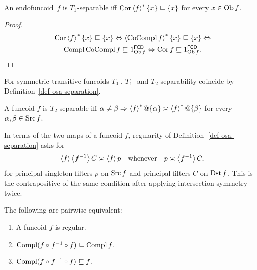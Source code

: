 \begin{prop}
An endofuncoid~$f$ is $T_{1}$-separable iff $\operatorname{Cor}\left\langle f\right\rangle ^{\ast}\{x\}\sqsubseteq\{x\}$ for every $x\in\operatorname{Ob} f$.
\end{prop}

\begin{proof}
\begin{multline*}
\operatorname{Cor} \left\langle f\right\rangle ^{\ast} \{ x \} \sqsubseteq \{ x \}
\Leftrightarrow \left\langle \operatorname{CoCompl} f\right\rangle ^{\ast} \{ x \} \sqsubseteq \{
x \} \Leftrightarrow \\ \operatorname{Compl} \operatorname{CoCompl} f \sqsubseteq
1^{\mathsf{FCD}}_{\operatorname{Ob} f} \Leftrightarrow \operatorname{Cor} f \sqsubseteq
1^{\mathsf{FCD}}_{\operatorname{Ob} f}.
\end{multline*}
\end{proof}

For symmetric transitive funcoids $T_{0}$-, $T_{1}$- and $T_{2}$-separability
coincide by Definition~\ref{def-osa-separation}.
\begin{obvious}
A funcoid $f$ is $T_{2}$-separable iff $\alpha\ne\beta\Rightarrow\left\langle f\right\rangle ^{\ast}@\{\alpha\}\asymp\left\langle f\right\rangle ^{\ast}@\{\beta\}$
for every $\alpha,\beta\in\operatorname{Src} f$.\end{obvious}
In terms of the two maps of a funcoid $f$, regularity of
Definition~\ref{def-osa-separation} asks for
\[
 \left\langle f\right\rangle\left\langle f^{-1}\right\rangle C\asymp\left\langle f\right\rangle p
 \quad\text{whenever}\quad
 p\asymp\left\langle f^{-1}\right\rangle C,
\]
for principal singleton filters $p$ on $\operatorname{Src} f$ and principal
filters $C$ on $\operatorname{Dst} f$. This is the contrapositive of the same
condition after applying intersection symmetry twice.

\begin{prop}
The following are pairwise equivalent:
\begin{enumerate}
  \item A funcoid $f$ is regular.
  \item $\operatorname{Compl} (f \circ f^{- 1} \circ f) \sqsubseteq \operatorname{Compl} f$.
  \item $\operatorname{Compl} (f \circ f^{- 1} \circ f) \sqsubseteq f$.
\end{enumerate}
\end{prop}

